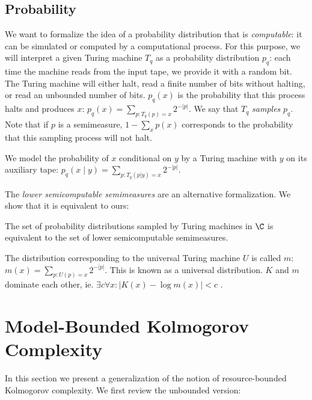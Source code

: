 \subsection*{Probability}

We want to formalize the idea of a probability distribution that is \emph{computable}: it can be simulated or computed by a computational process. For this purpose, we will interpret a given Turing machine $T_q$ as a probability distribution $p_q$: each time the machine reads from the input tape, we provide it with a random bit. The Turing machine will either halt, read a finite number of bits without halting, or read an unbounded number of bits. $p_q(x)$ is the probability that this process halts and produces $x$: $p_q(x) = \sum_{p: T_q(p) = x} 2^{-|p|}$. We say that $T_q$ \emph{samples} $p_q$. Note that if $p$ is a semimeasure, $1-\sum_x p(x)$ corresponds to the probability that this sampling process will not halt.

We model the probability of $x$ conditional on $y$ by a Turing machine with $y$ on its auxiliary tape: $p_q(x \mid y) = \sum_{p : T_q(p|y) = x} 2^{-|p|}$.  

The \emph{lower semicomputable semimeasures} \cite[Chapter~4]{DBLP:books/daglib/0087328} are an alternative formalization. We show that it is equivalent to ours:

\renewcommand*{\thefootnote}{\fnsymbol{footnote}}

\begin{lemma}\footnotemark[2]
The set of probability distributions sampled by Turing machines in $\C$ is equivalent to the set of lower semicomputable semimeasures.
\label{lemma:sampling-equivalence}
\end{lemma}


\noindent The distribution corresponding to the universal Turing machine $U$ is called $m$: $m(x) = \sum_{p: U(p) = x} 2^{-|p|}$. This is known as a universal distribution. $K$ and $m$ dominate each other, ie. $\exists c \forall x : |K(x) - \log m(x)| < c$ \cite[Theorem~4.3.3]{DBLP:books/daglib/0087328}.

\section{Model-Bounded Kolmogorov Complexity}

In this section we present a generalization of the notion of resource-bounded Kolmogorov complexity. We first review the unbounded version:

